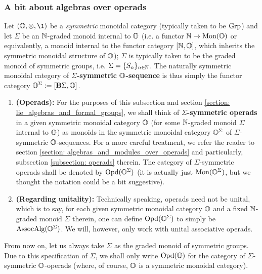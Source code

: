             \subsubsection{A bit about algebras over operads}
                \begin{definition} \label{def: symmetric_sequences}
                    Let $(\O, \tensor, \1)$ be a \textit{symmetric} monoidal category (typically taken to be $\mathrm{Grp}$) and let $\Sigma$ be an $\mathbb{N}$-graded monoid internal to $\mathbb{O}$ (i.e. a functor $\mathbb{N} \to \mathrm{Mon}(\mathbb{O})$ or equivalently, a monoid internal to the functor category $[\mathbb{N}, \mathbb{O}]$, which inherits the symmetric monoidal structure of $\mathbb{O}$); $\Sigma$ is typically taken to be the graded monoid of symmetric groups, i.e. $\Sigma = \{S_n\}_{n \in \mathbb{N}}$. The naturally symmetric monoidal category of \textbf{$\Sigma$-symmetric $\mathbb{O}$-sequence} is thus simply the functor category $\mathbb{O}^{\Sigma} := [\mathbf{B} \Sigma, \mathbb{O}]$.
                \end{definition}
            
                \begin{convention}[Operads ?] \label{conv: symmetric_sequences_as_operads}
                    \noindent
                    \begin{enumerate}
                        \item \textbf{(Operads):} For the purposes of this subsection and section \ref{section: lie_algebras_and_formal_groups}, we shall think of \textbf{$\Sigma$-symmetric operads} in a given symmetric monoidal category $\mathbb{O}$ (for some $\mathbb{N}$-graded monoid $\Sigma$ internal to $\mathbb{O}$) as monoids in the symmetric monoidal category $\mathbb{O}^{\Sigma}$ of $\Sigma$-symmetric $\mathbb{O}$-sequences. For a more careful treatment, we refer the reader to section \ref{section: algebras_and_modules_over_operads} and particularly, subsection \ref{subsection: operads} therein. The category of $\Sigma$-symmetric operads shall be denoted by $\mathrm{Opd}(\mathbb{O}^{\Sigma})$ (it is actually just $\mathrm{Mon}(\mathbb{O}^{\Sigma})$, but we thought the notation could be a bit suggestive).
                        \item \textbf{(Regarding unitality):} Technically speaking, operads need not be unital, which is to say, for each given symmetric monoidal category $\mathbb{O}$ and a fixed $\mathbb{N}$-graded monoid $\Sigma$ therein, one can define $\mathrm{Opd}(\mathbb{O}^{\Sigma})$ to simply be $\mathrm{Assoc}\mathrm{Alg}(\mathbb{O}^{\Sigma})$. We will, however, only work with unital associative operads.
                    \end{enumerate}
                \end{convention}
                \begin{convention}
                    From now on, let us always take $\Sigma$ as the graded monoid of symmetric groups. Due to this specification of $\Sigma$, we shall only write $\mathrm{Opd}(\mathbb{O})$ for the category of $\Sigma$-symmetric $\mathbb{O}$-operads (where, of course, $\mathbb{O}$ is a symmetric monoidal category).
                \end{convention}
                
